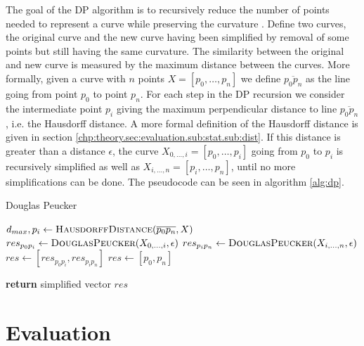 The goal of the \ac{DP} algorithm is to recursively reduce the number of points needed to represent a curve while preserving the curvature \citep{dp}. Define two curves, the original curve and the new curve having been simplified by removal of some points but still having the same curvature. The similarity between the original and new curve is measured by the maximum distance between the curves. More formally, given a curve with $n$ points $X = [p_0, \ldots, p_n]$ we define $\overline{p_0p_n}$ as the line going from point $p_0$ to point $p_n$. For each step in the \ac{DP} recursion we consider the intermediate point $p_i$ giving the maximum perpendicular distance to line $\overline{p_0p_n}$, i.e. the Hausdorff distance. A more formal definition of the Hausdorff distance is given in section \ref{chp:theory.sec:evaluation.sub:stat.sub:dist}. If this distance is greater than a distance $\epsilon$, the curve $X_{0,\ldots,i} = [p_0, \ldots, p_i]$ going from $p_0$ to $p_i$ is recursively simplified as well as $X_{i,\ldots, n} = [p_i, \ldots, p_n]$, until no more simplifications can be done. The pseudocode can be seen in algorithm \ref{alg:dp}.
\begin{algorithm}[H]
    \caption{Douglas Peucker}
    \label{alg:dp}
    \begin{algorithmic}

    \State $d_{max}, p_i \gets \textsc{HausdorffDistance}(\overline{p_0p_n}, X)$ 
        \State $res_{p_0p_i} \gets \textsc{DouglasPeucker}(X_{0,\ldots,i}, \epsilon)$ 
        \State $res_{p_ip_{n}} \gets \textsc{DouglasPeucker}(X_{i,\ldots, n}, \epsilon)$
        \State $res \gets [res_{p_0p_i}, res_{p_ip_{n}}]$
    \Else
        \State $res \gets [p_0, p_n]$
    \EndIf
    
\State \textbf{return} simplified vector $res$
\EndFunction
    \end{algorithmic}
\end{algorithm}


\section{Evaluation}

